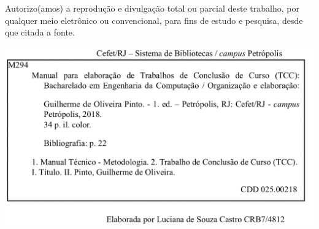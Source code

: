 \newpage
\begin{minipage}{0.9\textwidth}

{\normalsize 
\begin{center}
Autorizo(amos) a reprodução e divulgação total ou parcial deste trabalho, por qualquer meio
eletrônico ou convencional, para fins de estudo e pesquisa, desde que citada a fonte.
\end{center}
\vspace*{0.5cm}

}
\end{minipage}
\vspace*{5cm}
\begin{center}
\includegraphics[height=0.4\textwidth]{Figs/biblioteca_engcomp.jpeg} 
\end{center}







\newpage
\newcommand{\HRule}{\rule{0.6\linewidth}{0.5mm}}
\pagestyle{empty}

